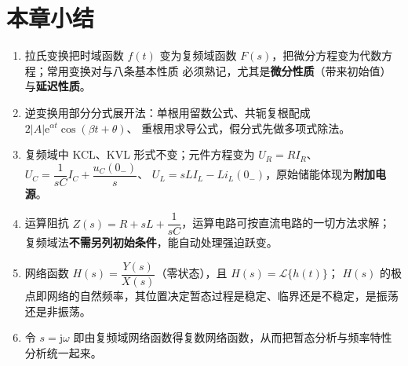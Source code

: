\section{本章小结}
\begin{enumerate}
  \item 拉氏变换把时域函数 $f(t)$ 变为复频域函数 $F(s)$，把微分方程变为代数方程；常用变换对与八条基本性质
        必须熟记，尤其是\textbf{微分性质}（带来初始值）与\textbf{延迟性质}。
  \item 逆变换用部分分式展开法：单根用留数公式、共轭复根配成 $2|A|\mathrm{e}^{\alpha t}\cos(\beta t+\theta)$、
        重根用求导公式，假分式先做多项式除法。
  \item 复频域中 KCL、KVL 形式不变；元件方程变为 $U_R=RI_R$、$U_C=\dfrac{1}{sC}I_C+\dfrac{u_C(0_-)}{s}$、
        $U_L=sLI_L-Li_L(0_-)$，原始储能体现为\textbf{附加电源}。
  \item 运算阻抗 $Z(s)=R+sL+\dfrac{1}{sC}$，运算电路可按直流电路的一切方法求解；
        复频域法\textbf{不需另列初始条件}，能自动处理强迫跃变。
  \item 网络函数 $H(s)=\dfrac{Y(s)}{X(s)}$（零状态），且 $H(s)=\mathcal{L}\{h(t)\}$；
        $H(s)$ 的极点即网络的自然频率，其位置决定暂态过程是稳定、临界还是不稳定，是振荡还是非振荡。
  \item 令 $s=\mathrm{j}\omega$ 即由复频域网络函数得复数网络函数，从而把暂态分析与频率特性分析统一起来。
\end{enumerate}

\endinput
